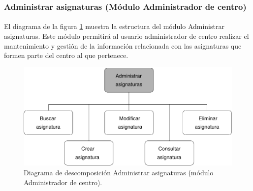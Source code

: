 \subsubsection{Administrar asignaturas (Módulo Administrador de centro)}

  \paragraph{}El diagrama de la figura
  \ref{diagramaDescomposicionAdministrarAsignaturas-admCentro} muestra la
  estructura del módulo Administrar asignaturas. Este módulo permitirá al
  usuario administrador de centro realizar el mantenimiento y gestión de la
  información relacionada con las asignaturas que formen parte del centro al
  que pertenece.

  \begin{figure}[!ht]
    \begin{center}
      \includegraphics[]{11.Disenyo_Arquitectonico/11.2.Diagramas_Descomposicion/11.2.3.Modulo_administrador_centro/AdministrarBBDD/AdministrarAsignaturas/Diagramas/administrar_asignaturas.pdf}
      \caption{Diagrama de descomposición Administrar asignaturas (módulo Administrador de centro).}
      \label{diagramaDescomposicionAdministrarAsignaturas-admCentro}
    \end{center}
  \end{figure}
